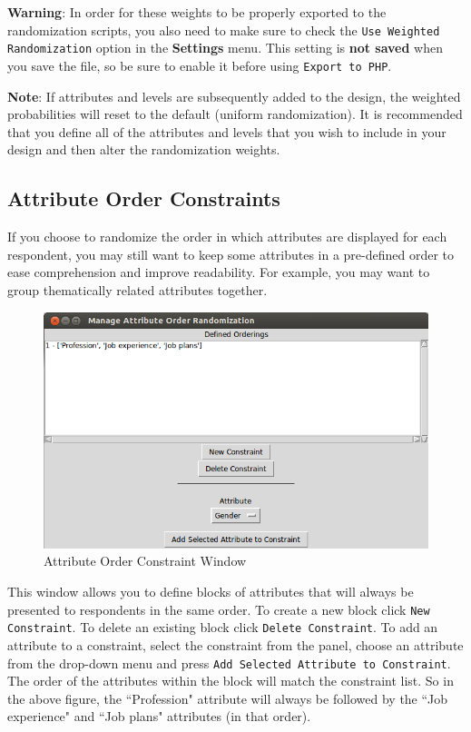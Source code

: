 \documentclass[12pt]{article}
\begin{document}
\textbf{Warning}: In order for these weights to be properly exported to the randomization scripts, you also need to make sure to check the \texttt{Use Weighted Randomization} option in the \textbf{Settings} menu. This setting is \textbf{not saved} when you save the  file, so be sure to enable it before using \texttt{Export to PHP}.

\textbf{Note}: If attributes and levels are subsequently added to the design, the weighted probabilities will reset to the default (uniform randomization). It is recommended that you define all of the attributes and levels that you wish to include in your design and then alter the randomization weights. 

\subsection{Attribute Order Constraints}

If you choose to randomize the order in which attributes are displayed for each respondent, you may still want to keep some attributes in a pre-defined order to ease comprehension and improve readability. For example, you may want to group thematically related attributes together.

\begin{figure}[ht!]
\centering\includegraphics[scale=.6]{graphics/order_screen.png}
\caption{Attribute Order Constraint Window}
\end{figure}

This window allows you to define blocks of attributes that will always be presented to respondents in the same order. To create a new block click \texttt{New Constraint}. To delete an existing block click \texttt{Delete Constraint}. To add an attribute to a constraint, select the constraint from the panel, choose an attribute from the drop-down menu and press \texttt{Add Selected Attribute to Constraint}. The order of the attributes within the block will match the constraint list. So in the above figure, the ``Profession" attribute will always be followed by the ``Job experience" and ``Job plans" attributes (in that order). 
\end{document}
